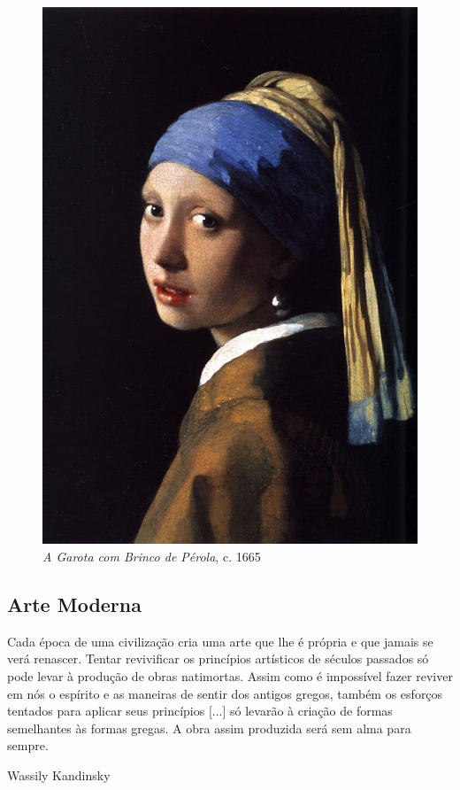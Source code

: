 \begin{figure}[ht!]
  \begin{center}
    \includegraphics[scale=1.3]{figs/vermeer_perola.png}
  \caption{\emph{A Garota com Brinco de Pérola}, c. 1665}
  \label{fig:vermeer:perola}
  \end{center}
\end{figure}

\subsection{Arte Moderna}

\setlength{\epigraphwidth}{0.8\textwidth}
\epigraph{Cada época de uma civilização cria uma arte que lhe é própria e que
  jamais se verá renascer. Tentar revivificar os princípios artísticos de
  séculos passados só pode levar à produção de obras natimortas. Assim como é
  impossível fazer reviver em nós o espírito e as maneiras de sentir dos antigos
  gregos, também os esforços tentados para aplicar seus princípios [...] só
  levarão à criação de formas semelhantes às formas gregas. A obra assim
  produzida será sem alma para sempre.}{Wassily Kandinsky~\cite{kandinsky}}

